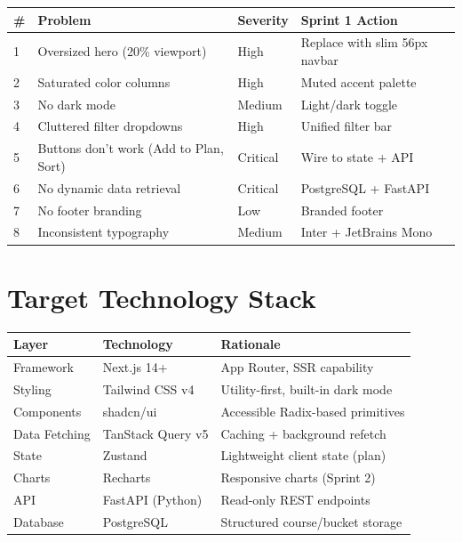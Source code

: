 \documentclass[11pt]{article}
\begin{document}
\begin{tabular}{p{} p{} p{} p{}}
\toprule
\textbf{\#} & \textbf{Problem} & \textbf{Severity} & \textbf{Sprint 1 Action} \\
\midrule
1 & Oversized hero (20\% viewport) & High & Replace with slim 56px navbar \\
2 & Saturated color columns & High & Muted accent palette \\
3 & No dark mode & Medium & Light/dark toggle \\
4 & Cluttered filter dropdowns & High & Unified filter bar \\
5 & Buttons don't work (Add to Plan, Sort) & Critical & Wire to state + API \\
6 & No dynamic data retrieval & Critical & PostgreSQL + FastAPI \\
7 & No footer branding & Low & Branded footer \\
8 & Inconsistent typography & Medium & Inter + JetBrains Mono \\
\bottomrule
\end{tabular}

\section{Target Technology Stack}

\begin{tabular}{p{} p{} p{}}
\toprule
\textbf{Layer} & \textbf{Technology} & \textbf{Rationale} \\
\midrule
Framework & Next.js 14+ & App Router, SSR capability \\
Styling & Tailwind CSS v4 & Utility-first, built-in dark mode \\
Components & shadcn/ui & Accessible Radix-based primitives \\
Data Fetching & TanStack Query v5 & Caching + background refetch \\
State & Zustand & Lightweight client state (plan) \\
Charts & Recharts & Responsive charts (Sprint 2) \\
API & FastAPI (Python) & Read-only REST endpoints \\
Database & PostgreSQL & Structured course/bucket storage \\
\bottomrule
\end{tabular}
\end{document}
